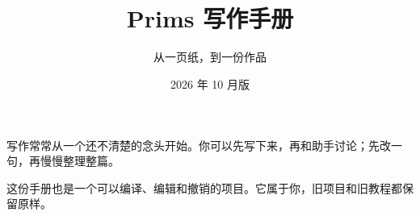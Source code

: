 \documentclass[UTF8,fontset=fandol,11pt,a4paper]{ctexart}
\title{\vspace{-1em}{\Huge\color{Ink}纸上微光}\\[0.5em]{\Large Prims 写作手册}}
\author{从一页纸，到一份作品}
\date{2026 年 10 月版}
\begin{document}
\maketitle
\begin{center}\begin{minipage}{0.84\linewidth}
写作常常从一个还不清楚的念头开始。你可以先写下来，再和助手讨论；先改一句，再慢慢整理整篇。

这份手册也是一个可以编译、编辑和撤销的项目。它属于你，旧项目和旧教程都保留原样。
\end{minipage}\end{center}
\tableofcontents






\end{document}
